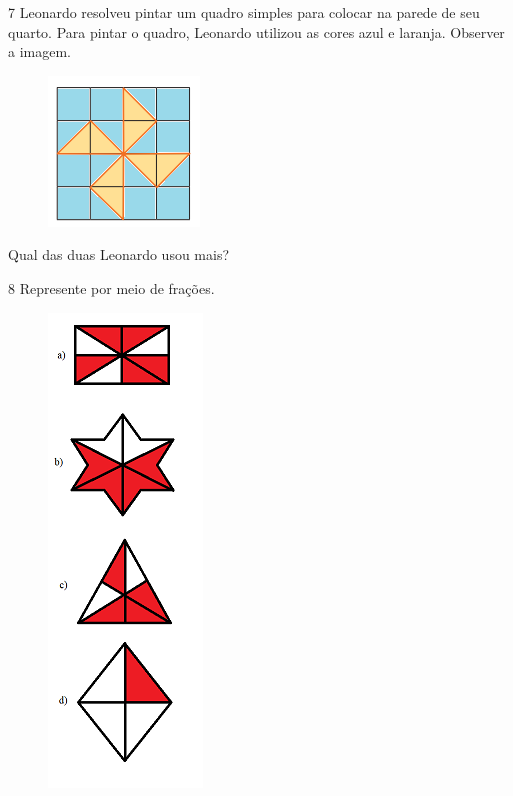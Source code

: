 \num{7}  Leonardo resolveu pintar um quadro simples para colocar na parede de
seu quarto. Para pintar o quadro, Leonardo utilizou as cores azul e laranja.
Observer a imagem.

\begin{figure}[H]
\centering
\includegraphics[width=.6\textwidth]{./imgSAEB_6_MAT/media/image33.png}
\end{figure}

Qual das duas Leonardo usou mais?


\num{8}  Represente por meio de frações.

\begin{figure}[htpb!]
\includegraphics[width=1.61458in,height=4.94792in]{./imgSAEB_6_MAT/media/image34.png}
\end{figure}


